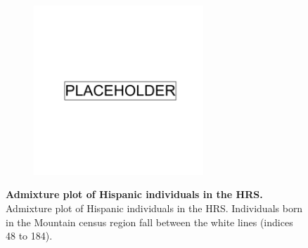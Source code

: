 \newpage

\begin{figure}
    \centering
    \begin{subfigure}{\textwidth}
    \includegraphics[width=0.7\textwidth]{placeholder.png}
    \end{subfigure}
    \caption[Admixture plot of Hispanic individuals in the HRS]{\textbf{Admixture plot of Hispanic individuals in the HRS.} Admixture plot of Hispanic individuals in the HRS. Individuals born in the Mountain census region fall between the white lines (indices 48 to 184).}
    \label{fig:supp_hrs_hisp_admix}
\end{figure}